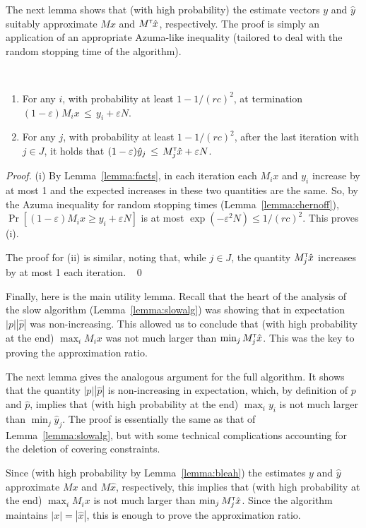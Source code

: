 \documentclass[11pt]{svjour3} \usepackage{fullpage}
\newcommand{\primalOf}[1]{{{#1}}}
\newcommand{\dualOf}[1]{{\hat{#1}}}
\newcommand{\MM}{M}
\newcommand{\JJ}{J}
\newcommand{\xp}{\primalOf x}
\newcommand{\yp}{\primalOf y}
\newcommand{\pp}{\primalOf p}
\newcommand{\xd}{\dualOf x}
\newcommand{\yd}{\dualOf y}
\newcommand{\pd}{\dualOf p}
\newenvironment{Proof}{\begin{proof}}{{} ~\hfill\hfill\qed~\end{proof}}
\newcommand{\eps}{\varepsilon}
\newcommand{\tran}{^{\scriptscriptstyle \sf T\hspace*{-0.05em}}}
\newcommand{\rows}{r}
\newcommand{\columns}{c}
\begin{document}
The next lemma shows that (with high probability) the estimate vectors $\yp$ and $\yd$ suitably approximate $\MM\xp$ and $\MM\tran\xd$, respectively.
The proof is simply an application of an appropriate Azuma-like inequality
(tailored to deal with the random stopping time of the algorithm).

\begin{lemma} \label{lemma:bleah}~
\begin{enumerate}
\item
For any $i$, with probability at least
$1-1/(\rows\columns)^2$, at termination
$(1-\eps) \MM_i\xp \,\le\, \yp_i + \eps N$.
\item
For any $j$, with probability at least
$1-1/(\rows\columns)^2$, after the last iteration with $j\in\JJ$,
it holds that $(1-\eps) \yd_j \,\le\, \MM_j\tran \xd + \eps N$.
\end{enumerate}
\end{lemma}
\begin{Proof}
(i) By Lemma~\ref{lemma:facts}, in each iteration each $\MM_i\xp$ and $\yp_i$ increase by at most 1 and the expected increases in these two quantities are the same.
So, by the Azuma inequality for random stopping times (Lemma~\ref{lemma:chernoff}),
$\Pr[(1-\eps) \MM_i\xp \ge \yp_i + \eps N]$ 
is at most
$\exp(-\eps^2N) \le 1/(\rows\columns)^2$.
This proves (i).  

The proof for (ii) is similar, noting that, while $j\in\JJ$,
the quantity $\MM_j\tran\xd$ increases by at most 1 each iteration.
\end{Proof}

Finally, here is the main utility lemma.
Recall that the heart of the analysis of the slow algorithm
(Lemma~\ref{lemma:slowalg})
was showing that in expectation $|\pp||\pd|$ was non-increasing.
This allowed us to conclude that (with high probability at the end)
$\max_i M_i\xp$ was not much larger than $\min_j M\tran_j \xd$.
This was the key to proving the approximation ratio.

The next lemma gives the analogous argument for the full algorithm.
It shows that the quantity $|\pp||\pd|$
is non-increasing in expectation,
which, by definition of $\pp$ and $\pd$,
implies that (with high probability at the end)
$\max_i \yp_i$ is not much larger than $\min_j \yd_j$.
The proof is essentially the same as that of Lemma~\ref{lemma:slowalg},
but with some technical complications accounting for the deletion
of covering constraints.

Since (with high probability by Lemma~\ref{lemma:bleah})
the estimates $\yp$ and $\yd$ approximate $M\xp$
and $M\xd$, respectively,
this implies that (with high probability at the end)
$\max_i M_i\xp$ is not much larger than $\min_j M_j \tran\xd$.
Since the algorithm maintains $|\xp| = |\xd|$,
this is enough to prove the approximation ratio.
\end{document}
